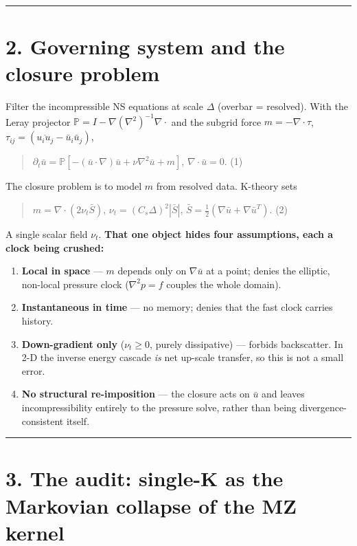 \documentclass[11pt]{article}
\begin{document}
\medskip\hrule\medskip


\section*{2. Governing system and the closure problem}


Filter the incompressible NS equations at scale $\Delta $ (overbar = resolved). With the Leray projector $\mathbb{P} = I - \nabla (\nabla ^{2})^{-1}\nabla \cdot $ and the subgrid force $m = -\nabla \cdot \tau $, $\tau _{ij} = (\overline{u_{i} u_{j}} - \bar{u}_{i} \bar{u}_{j})$,


\begin{quote}
$\partial _{t}\bar{u} = \mathbb{P}[ -(\bar{u}\cdot \nabla )\bar{u} + \nu \nabla ^{2}\bar{u} + m ]$, $\nabla \cdot \bar{u} = 0$. (1)
\end{quote}


The closure problem is to model $m$ from resolved data. K-theory sets


\begin{quote}
$m = \nabla \cdot (2 \nu _{t} \bar{S})$, $\nu _{t} = (C_{s} \Delta )^{2}|\bar{S}|$, $\bar{S} = \tfrac{1}{2}(\nabla \bar{u} + \nabla \bar{u}^{T})$. (2)
\end{quote}


A single scalar field $\nu _{t}$. \textbf{That one object hides four assumptions, each a clock being crushed:}


\begin{enumerate}
\item \textbf{Local in space} — $m$ depends only on $\nabla \bar{u}$ at a point; denies the elliptic, non-local pressure clock ($\nabla ^{2}p=f$ couples the whole domain).
\item \textbf{Instantaneous in time} — no memory; denies that the fast clock carries history.
\item \textbf{Down-gradient only} ($\nu _{t}\ge 0$, purely dissipative) — forbids backscatter. In 2-D the inverse energy cascade \emph{is} net up-scale transfer, so this is not a small error.
\item \textbf{No structural re-imposition} — the closure acts on $\bar{u}$ and leaves incompressibility entirely to the pressure solve, rather than being divergence-consistent itself.
\end{enumerate}


\medskip\hrule\medskip


\section*{3. The audit: single-K as the Markovian collapse of the MZ kernel}
\end{document}

